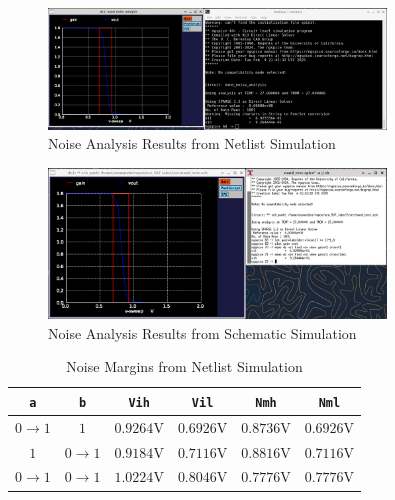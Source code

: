 \documentclass{article}
\begin{document}
	\begin{figure}[H]
		\centerline{\includegraphics[width=0.8\textwidth]{nand_noise_analysis.png}}
		\caption{Noise Analysis Results from Netlist Simulation}
		\label{fig::nand_noise_analysis}
	\end{figure}
	
	\begin{figure}[H]
		\centerline{\includegraphics[width=0.8\textwidth]{nand_noise_analysis_schem.png}}
		\caption{Noise Analysis Results from Schematic Simulation}
		\label{fig::nand_noise_analysis_schem}
	\end{figure}
	
	\begin{table}[H]
	\begin{center}
	\caption{Noise Margins from Netlist Simulation}
	\label{table::nand_gate_noise_analysis}
	\begin{tabular}{| c | c | c | c | c | c |}
		\hline
		\texttt{a} & \texttt{b} & \texttt{Vih} & \texttt{Vil} & \texttt{Nmh} & \texttt{Nml} \\
		\hline	
		$0 \rightarrow 1$ & $1$ & $0.9264 \text{V}$ & $0.6926 \text{V}$ & $0.8736 \text{V}$ & $0.6926 \text{V}$\\
		\hline	
		$1$ & $0 \rightarrow 1$ & $0.9184 \text{V}$ & $0.7116 \text{V}$ & $0.8816 \text{V}$ & $0.7116 \text{V}$\\
		\hline	
		$0 \rightarrow 1$ & $0 \rightarrow 1$ & $1.0224 \text{V}$ & $0.8046 \text{V}$ & $0.7776 \text{V}$ & $0.7776 \text{V}$\\
		\hline
	\end{tabular}
	\end{center}
	\end{table}
	
\end{document}

